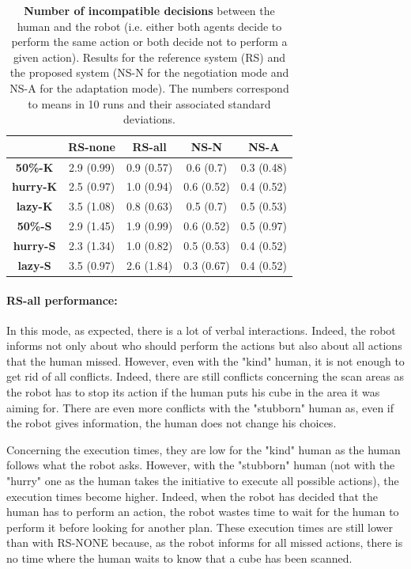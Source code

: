 \documentclass[english,a4paper,11pt,twoside]{StyleThese}
\begin{document}
\begin{table}[!h]
\centering
  \begin{tabular}{|c||c|c|c|c|}
  \hline
     & \textbf{RS-none} & \textbf{RS-all} & \textbf{NS-N} & \textbf{NS-A} \\
  \hline
  \hline
     \textbf{50\%-K} & 2.9 (0.99) & 0.9 (0.57) & 0.6 (0.7) & 0.3 (0.48) \\
  \hline
     \textbf{hurry-K} & 2.5 (0.97) & 1.0 (0.94) & 0.6 (0.52) & 0.4 (0.52)\\
  \hline
     \textbf{lazy-K} & 3.5 (1.08) & 0.8 (0.63) & 0.5 (0.7) & 0.5 (0.53) \\
  \hline
     \textbf{50\%-S} & 2.9 (1.45) & 1.9 (0.99) & 0.6 (0.52) & 0.5 (0.97) \\
  \hline
     \textbf{hurry-S} & 2.3 (1.34) & 1.0 (0.82) & 0.5 (0.53) & 0.4 (0.52) \\
  \hline
     \textbf{lazy-S} & 3.5 (0.97) & 2.6 (1.84) & 0.3 (0.67) & 0.4 (0.52)  \\
  \hline
  \end{tabular}
   \caption{\textbf{Number of incompatible decisions} between the human and the robot (i.e. either both agents decide to perform the same action or both decide not to perform a given action). Results for the reference system (RS) and the proposed system (NS-N for the negotiation mode and NS-A for the adaptation mode). The numbers correspond to means in 10 runs and their associated standard deviations.}
   \label{tab:incompatibleDecisions} 
\end{table}

\paragraph{RS-all performance:}
In this mode, as expected, there is a lot of verbal interactions. Indeed, the robot informs not only about who should perform the actions but also about all actions that the human missed. However, even with the "kind" human, it is not enough to get rid of all conflicts. Indeed, there are still conflicts concerning the scan areas as the robot has to stop its action if the human puts his cube in the area it was aiming for. There are even more conflicts with the "stubborn" human as, even if the robot gives information, the human does not change his choices.

Concerning the execution times, they are low for the "kind" human as the human follows what the robot asks. However, with the "stubborn" human (not with the "hurry" one as the human takes the initiative to execute all possible actions), the execution times become higher. Indeed, when the robot has decided that the human has to perform an action, the robot wastes time to wait for the human to perform it before looking for another plan. These execution times are still lower than with RS-NONE because, as the robot informs for all missed actions, there is no time where the human waits to know that a cube has been scanned.
\end{document}
